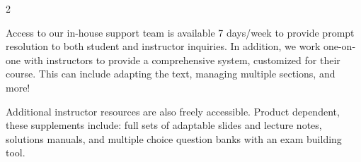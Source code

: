 \begin{center}
\begin{multicols}{2}
\parbox{0.9\linewidth}{
	Access to our in-house support team is available 7 days/week to provide prompt resolution to both student and instructor inquiries. In addition, we work one-on-one with instructors to provide a comprehensive system, customized for their course. This can include adapting the text, managing multiple sections, and more!
	}

\columnbreak
	\parbox{0.9\linewidth}{
Additional instructor resources are also freely accessible. Product dependent, these supplements include: full sets of adaptable slides and lecture notes, solutions manuals, and multiple choice question banks with an exam building tool.
	}
\end{multicols}
\end{center}

\vfill

\begin{center}
	\textcolor{lscstextcolour}{\textbf{\fontsize{18}{22}\selectfont {Contact Lyryx Today!}}} \\
\medskip
\textcolor{lyryxcolour}{\textbf{\fontsize{14}{18}\selectfont {info@lyryx.com}}} \\

\end{center}

\vfill

\setlength{\parskip}{\baselineskip}
